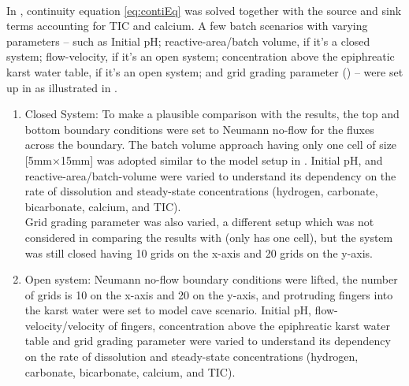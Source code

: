 \paragraph*{\DuMuX} In \DuMuX, continuity equation \ref{eq:contiEq} was solved together with the source and sink terms accounting for 
TIC and calcium. A few batch scenarios with varying parameters -- such as Initial pH; reactive-area/batch volume, if it's a closed system; 
flow-velocity, if it's an open system;  concentration above the epiphreatic karst water table, if it's an open system; and grid grading 
parameter () -- were set up in \DuMuX as illustrated in . 
\begin{enumerate}
    \item Closed System: To make a plausible comparison with the \MATLAB results, the top and bottom boundary 
    conditions were set to Neumann no-flow for the fluxes across the boundary. The batch volume approach having only 
    one cell of size [5mm$\times$15mm] was adopted similar to the model setup in \MATLAB. Initial pH, and reactive-area/batch-volume 
    were varied to understand its dependency on the rate of dissolution and steady-state concentrations (hydrogen, carbonate, bicarbonate, calcium, and TIC).\\
    Grid grading parameter was also varied, a different setup which was not considered in comparing the results with 
    \MATLAB (\MATLAB only has one cell), but the system was still closed having 10 grids on the x-axis and 20 grids on the y-axis. 
    \item Open system: Neumann no-flow boundary conditions were lifted, the number of grids is 10 on the x-axis and 20 on the y-axis, 
    and  protruding  fingers into the karst water were set to model cave scenario. Initial pH, flow-velocity/velocity of fingers,  
    concentration above the epiphreatic karst water table and grid grading parameter were varied to understand its dependency on the rate 
    of dissolution and steady-state concentrations (hydrogen, carbonate, bicarbonate, calcium, and TIC).
\end{enumerate}


